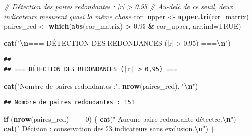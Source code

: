 \documentclass[
]{article}
\newenvironment{Shaded}{\begin{snugshade}}{\end{snugshade}}
\newcommand{\AttributeTok}[1]{\textcolor[rgb]{0.13,0.29,0.53}{#1}}
\newcommand{\CommentTok}[1]{\textcolor[rgb]{0.56,0.35,0.01}{\textit{#1}}}
\newcommand{\ConstantTok}[1]{\textcolor[rgb]{0.56,0.35,0.01}{#1}}
\newcommand{\ControlFlowTok}[1]{\textcolor[rgb]{0.13,0.29,0.53}{\textbf{#1}}}
\newcommand{\DecValTok}[1]{\textcolor[rgb]{0.00,0.00,0.81}{#1}}
\newcommand{\FloatTok}[1]{\textcolor[rgb]{0.00,0.00,0.81}{#1}}
\newcommand{\FunctionTok}[1]{\textcolor[rgb]{0.13,0.29,0.53}{\textbf{#1}}}
\newcommand{\NormalTok}[1]{#1}
\newcommand{\OtherTok}[1]{\textcolor[rgb]{0.56,0.35,0.01}{#1}}
\newcommand{\SpecialCharTok}[1]{\textcolor[rgb]{0.81,0.36,0.00}{\textbf{#1}}}
\newcommand{\StringTok}[1]{\textcolor[rgb]{0.31,0.60,0.02}{#1}}
\begin{document}
\begin{Shaded}
\begin{Highlighting}[]
\CommentTok{\# Détection des paires redondantes : |r| \textgreater{} 0.95}
\CommentTok{\# Au{-}delà de ce seuil, deux indicateurs mesurent quasi la même chose}
\NormalTok{cor\_upper }\OtherTok{\textless{}{-}} \FunctionTok{upper.tri}\NormalTok{(cor\_matrix)}
\NormalTok{paires\_red }\OtherTok{\textless{}{-}} \FunctionTok{which}\NormalTok{(}\FunctionTok{abs}\NormalTok{(cor\_matrix) }\SpecialCharTok{\textgreater{}} \FloatTok{0.95} \SpecialCharTok{\&}\NormalTok{ cor\_upper, }\AttributeTok{arr.ind=}\ConstantTok{TRUE}\NormalTok{)}

\FunctionTok{cat}\NormalTok{(}\StringTok{"}\SpecialCharTok{\textbackslash{}n}\StringTok{=== DÉTECTION DES REDONDANCES (|r| \textgreater{} 0,95) ===}\SpecialCharTok{\textbackslash{}n}\StringTok{"}\NormalTok{)}
\end{Highlighting}
\end{Shaded}

\begin{verbatim}
## 
## === DÉTECTION DES REDONDANCES (|r| > 0,95) ===
\end{verbatim}

\begin{Shaded}
\begin{Highlighting}[]
\FunctionTok{cat}\NormalTok{(}\StringTok{"Nombre de paires redondantes :"}\NormalTok{, }\FunctionTok{nrow}\NormalTok{(paires\_red), }\StringTok{"}\SpecialCharTok{\textbackslash{}n}\StringTok{"}\NormalTok{)}
\end{Highlighting}
\end{Shaded}

\begin{verbatim}
## Nombre de paires redondantes : 151
\end{verbatim}

\begin{Shaded}
\begin{Highlighting}[]
\ControlFlowTok{if}\NormalTok{ (}\FunctionTok{nrow}\NormalTok{(paires\_red) }\SpecialCharTok{==} \DecValTok{0}\NormalTok{) \{}
  \FunctionTok{cat}\NormalTok{(}\StringTok{"  Aucune paire redondante détectée.}\SpecialCharTok{\textbackslash{}n}\StringTok{"}\NormalTok{)}
  \FunctionTok{cat}\NormalTok{(}\StringTok{"  Décision : conservation des 23 indicateurs sans exclusion.}\SpecialCharTok{\textbackslash{}n}\StringTok{"}\NormalTok{)}
\NormalTok{\}}
\end{Highlighting}
\end{Shaded}
\end{document}
